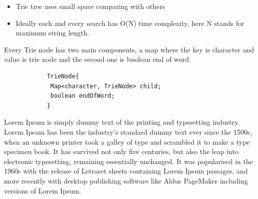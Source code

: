 \documentclass[12pt,a4paper]{report}
\begin{document}
\begin{itemize}
\item Trie tree uses small space comparing with others
\item Ideally each and every search has O(N) time complexity, here N stands for maximum string length.
\end{itemize}

Every Trie node has two main components, a map where the key is character and value is trie node and the second one is boolean end of word.

\begin{lstlisting}
			TrieNode{
			 Map<character, TrieNode> child;
			 boolean endOfWord;
			}
\end{lstlisting}

Lorem Ipsum is simply dummy text of the printing and typesetting industry. Lorem Ipsum has been the industry's standard dummy text ever since the 1500s, when an unknown printer took a galley of type and scrambled it to make a type specimen book. It has survived not only five centuries, but also the leap into electronic typesetting, remaining essentially unchanged. It was popularised in the 1960s with the release of Letraset sheets containing Lorem Ipsum passages, and more recently with desktop publishing software like Aldus PageMaker including versions of Lorem Ipsum.
\end{document}
